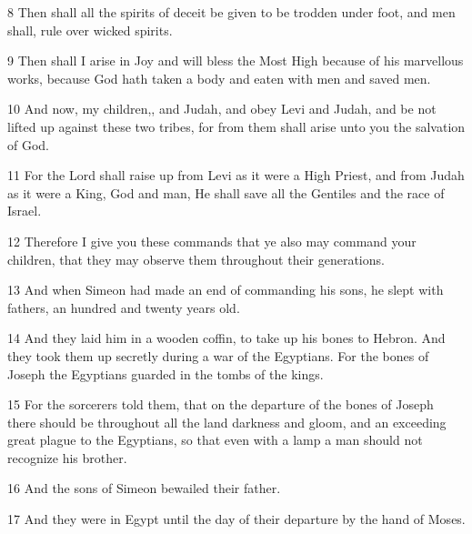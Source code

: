 \par 8 Then shall all the spirits of deceit be given to be trodden under foot, and men shall, rule over wicked spirits.

\par 9 Then shall I arise in Joy and will bless the Most High because of his marvellous works, because God hath taken a body and eaten with men and saved men.

\par 10 And now, my children,, and Judah, and obey Levi and Judah, and be not lifted up against these two tribes, for from them shall arise unto you the salvation of God.

\par 11 For the Lord shall raise up from Levi as it were a High Priest, and from Judah as it were a King, God and man, He shall save all the Gentiles and the race of Israel.

\par 12 Therefore I give you these commands that ye also may command your children, that they may observe them throughout their generations.

\par 13 And when Simeon had made an end of commanding his sons, he slept with fathers, an hundred and twenty years old.

\par 14 And they laid him in a wooden coffin, to take up his bones to Hebron. And they took them up secretly during a war of the Egyptians. For the bones of Joseph the Egyptians guarded in the tombs of the kings.

\par 15 For the sorcerers told them, that on the departure of the bones of Joseph there should be throughout all the land darkness and gloom, and an exceeding great plague to the Egyptians, so that even with a lamp a man should not recognize his brother.

\par 16 And the sons of Simeon bewailed their father.

\par 17 And they were in Egypt until the day of their departure by the hand of Moses.


